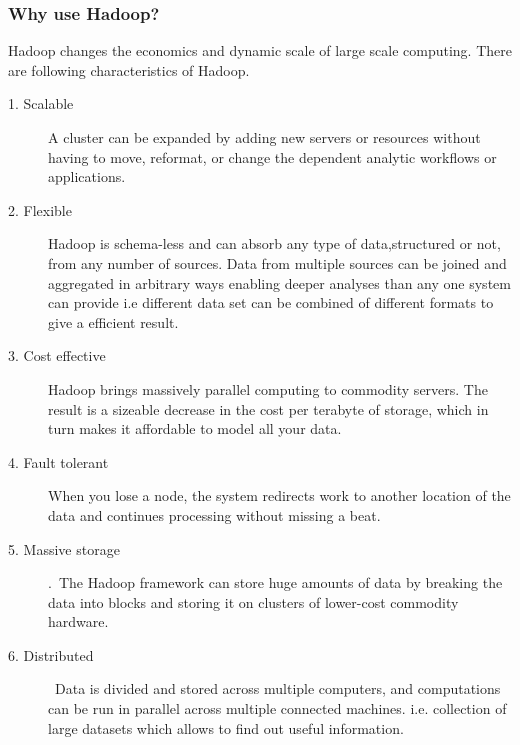 \subsubsection{Why use Hadoop?}
Hadoop changes the economics and dynamic scale of large scale computing.
There are following characteristics of Hadoop.
\begin{description}

\item[1. Scalable] A cluster can be expanded by adding new servers or resources without having to move, reformat, or change the dependent analytic workflows or applications.
\item[2. Flexible] Hadoop is schema-less and can absorb any type of data,structured   or not, from any number of sources. Data from multiple sources can be joined and   aggregated in arbitrary ways enabling deeper analyses than any one system can provide i.e different data set can be combined of different formats to give a efficient result.
\item[3. Cost effective] Hadoop brings massively parallel computing to commodity servers. The result is a sizeable decrease in the cost per terabyte of storage, which in turn makes it affordable to model all your data.
\item[4. Fault tolerant]  When you lose a node, the system redirects work to another location of the data and continues processing without missing a beat.
\item[5. Massive storage]. The Hadoop framework can store huge amounts of data by breaking the data into blocks and storing it on clusters of lower-cost commodity hardware.
\item[6. Distributed] Data is divided and stored across multiple computers, and computations can be run in parallel across multiple connected machines.
i.e. collection of large datasets which allows to find out useful information.
\end{description}

